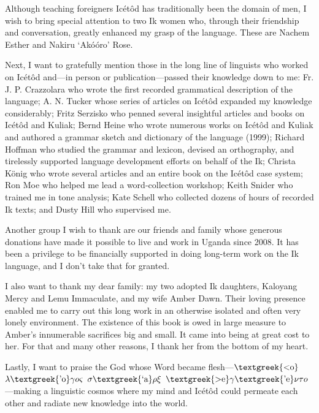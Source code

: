 Although teaching foreigners Icétôd has traditionally been the domain of men, I wish to bring special attention to two Ik women who, through their friendship and conversation, greatly enhanced my grasp of the language. These are Nachem Esther and Nakiru ‘Akóóro’ Rose.

Next, I want to gratefully mention those in the long line of linguists who worked on Icétôd and—in person or publication—passed their knowledge down to me: Fr. J. P. Crazzolara who wrote the first recorded grammatical description of the language; A. N. Tucker whose series of articles on Icétôd expanded my knowledge considerably; Fritz Serzisko who penned several insightful articles and books on Icétôd and Kuliak; Bernd Heine who wrote numerous works on Icétôd and Kuliak and authored a grammar sketch and dictionary of the language (1999); Richard Hoffman who studied the grammar and lexicon, devised an orthography, and tirelessly supported language development efforts on behalf of the Ik; Christa K\"{o}nig who wrote several articles and an entire book on the Icétôd case system; Ron Moe who helped me lead a word-collection workshop; Keith Snider who trained me in tone analysis; Kate Schell who collected dozens of hours of recorded Ik texts; and Dusty Hill who supervised me.

Another group I wish to thank are our friends and family whose generous donations have made it possible to live and work in Uganda since 2008. It has been a privilege to be financially supported in doing long-term work on the Ik language, and I don’t take that for granted. 

I also want to thank my dear family: my two adopted Ik daughters, Kaloyang Mercy and Lemu Immaculate, and my wife Amber Dawn. Their loving presence enabled me to carry out this long work in an otherwise isolated and often very lonely environment. The existence of this book is owed in large measure to Amber’s innumerable sacrifices big and small. It came into being at great cost to her. For that and many other reasons, I thank her from the bottom of my heart.

Lastly, I want to praise the God whose Word became flesh—$\text{\textgreek{<o}}$ $\lambda \text{\textgreek{'o}}\gamma o\varsigma $ $\sigma \text{\textgreek{`a}}\rho \xi $ $\text{\textgreek{>e}}\gamma \text{\textgreek{'e}}\nu \varepsilon \tau o$—making a linguistic cosmos where my mind and Icétôd could permeate each other and radiate new knowledge into the world.

